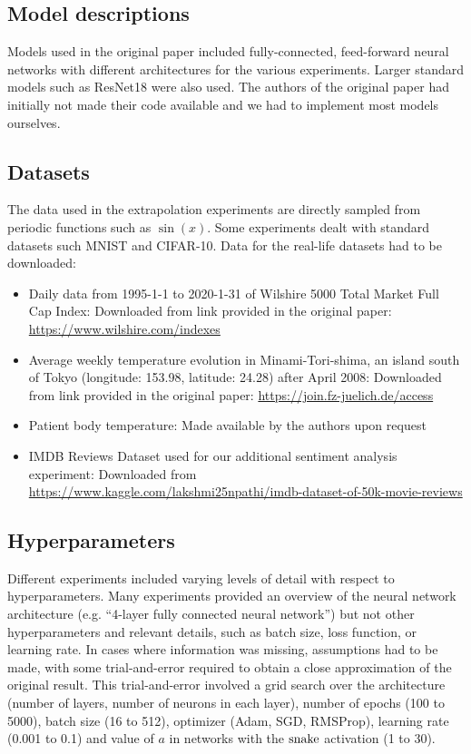 \subsection{Model descriptions}

Models used in the original paper included fully-connected, feed-forward neural networks with different architectures for the various experiments. Larger standard models such as ResNet18 were also used. The authors of the original paper had initially not made their code available and we had to implement most models ourselves.

\subsection{Datasets}

The data used in the extrapolation experiments are directly sampled from periodic functions such as $\sin(x)$. Some experiments dealt with standard datasets such MNIST and CIFAR-10.
Data for the real-life datasets had to be downloaded:
\begin{itemize}

    \item Daily data from 1995-1-1 to 2020-1-31 of Wilshire 5000 Total Market Full Cap Index: Downloaded from link provided in the original paper: \url{https://www.wilshire.com/indexes}
    \item Average weekly temperature evolution in Minami-Tori-shima, an island south of Tokyo (longitude: 153.98, latitude: 24.28) after April 2008: Downloaded from link provided in the original paper: \url{https://join.fz-juelich.de/access}
    \item Patient body temperature: Made available by the authors upon request
    \item IMDB Reviews Dataset used for our additional sentiment analysis experiment: Downloaded from \url{https://www.kaggle.com/lakshmi25npathi/imdb-dataset-of-50k-movie-reviews}
    
    
\end{itemize}

\subsection{Hyperparameters}

Different experiments included varying levels of detail with respect to hyperparameters. Many experiments provided an overview of the neural network architecture (e.g. ``4-layer fully connected neural network'') but not other hyperparameters and relevant details, such as batch size, loss function, or learning rate. In cases where information was missing, assumptions had to be made, with some trial-and-error required to obtain a close approximation of the original result. This trial-and-error involved a grid search over the architecture (number of layers, number of neurons in each layer), number of epochs (100 to 5000), batch size (16 to 512), optimizer (Adam, SGD, RMSProp), learning rate (0.001 to 0.1) and value of $a$ in networks with the $ \operatorname{snake} $ activation (1 to 30).

